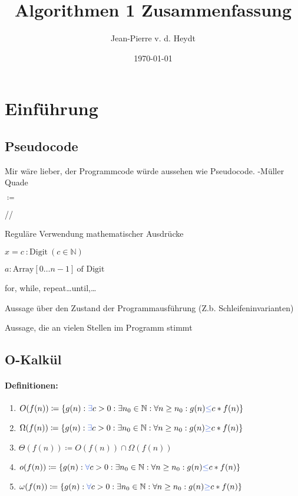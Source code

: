 \documentclass[11pt]{article}
\title{Algorithmen 1 Zusammenfassung}
\author{Jean-Pierre v. d. Heydt}
\date{\today}
\def \dozent{Müller Quade}
\def \texcol{RoyalBlue}
\begin{document}
\maketitle
\thispagestyle{empty}
\clearpage

\tableofcontents
\clearpage

\section{Einführung}

\subsection{Pseudocode}

\glqq Mir wäre lieber, der Programmcode würde aussehen wie Pseudocode.\grqq{} -\dozent

\begin{description}[leftmargin=!,labelwidth=\widthof{\bfseries Deklaration}]
\item[Zuweisung]$\coloneqq$
\item[Kommentar]//
\item[Ausdrücke]Reguläre Verwendung mathematischer Ausdrücke
\item[Deklaration]$x=c\ :\text{Digit}\ (c\in\mathbb{N})$
\item[Array]$a:\text{Array}[0\dots n-1]\ \text{of Digit}$
\item[Schleifen]for, while, repeat\dots until,\dots
\item[assert] Aussage über den Zustand der Programmausführung (Z.b. Schleifeninvarianten)
\item[invariant] Aussage, die an \glqq  vielen\grqq{} Stellen im Programm stimmt
\end{description}

\subsection{O-Kalkül}

\paragraph{Definitionen:}
\begin{enumerate}
\item $O(f(n))\coloneqq \{ g(n):\textcolor{\texcol}{\exists} c>0:\exists n_{0}\in \mathbb{N} :\forall n\geq n_{0}:g(n)\textcolor{\texcol}{\leq} c*f(n)\}$ 
\item $\Omega (f(n))\coloneqq \{ g(n):\textcolor{\texcol}{\exists} c>0:\exists n_{0}\in \mathbb{N} :\forall n\geq n_{0}:g(n)\textcolor{\texcol}{\geq} c*f(n)\}$ 
\item $\Theta (f(n)) \coloneqq O(f(n))\cap \Omega (f(n))$ 
\item $o(f(n))\coloneqq \{ g(n):\textcolor{\texcol}{\forall} c>0:\exists n_{0}\in \mathbb{N} :\forall n\geq n_{0}:g(n)\textcolor{\texcol}{\leq} c*f(n)\}$ 
\item $\omega (f(n))\coloneqq \{ g(n):\textcolor{\texcol}{\forall} c>0:\exists n_{0}\in \mathbb{N} :\forall n\geq n_{0}:g(n)\textcolor{\texcol}{\geq} c*f(n)\}$ 
\end{enumerate}
\end{document}
